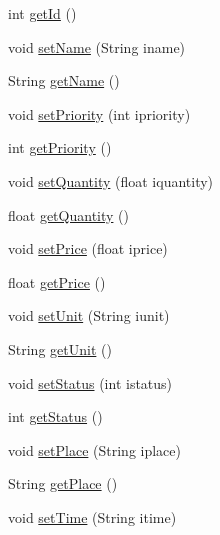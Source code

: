 \begin{DoxyCompactItemize}
\item 
int \hyperlink{classvip2012_1_1g07_1_1shoppinglist_1_1Item_ad9414ee145d458f315961c1f2e2faf60}{get\-Id} ()
\item 
void \hyperlink{classvip2012_1_1g07_1_1shoppinglist_1_1Item_aa9872e25ee885972342abda59bb3f616}{set\-Name} (String iname)
\item 
String \hyperlink{classvip2012_1_1g07_1_1shoppinglist_1_1Item_a88788d3b8f741aa86f961b71416a55be}{get\-Name} ()
\item 
void \hyperlink{classvip2012_1_1g07_1_1shoppinglist_1_1Item_a447e1639777c78e1a03e3e76553c94d5}{set\-Priority} (int ipriority)
\item 
int \hyperlink{classvip2012_1_1g07_1_1shoppinglist_1_1Item_a5b30fc72fb323a26f8982203546919f0}{get\-Priority} ()
\item 
void \hyperlink{classvip2012_1_1g07_1_1shoppinglist_1_1Item_aa3608aed9d930e5044b9f7cf6ac88830}{set\-Quantity} (float iquantity)
\item 
float \hyperlink{classvip2012_1_1g07_1_1shoppinglist_1_1Item_a18b61c503de2ea99dd5fb92cfcebfa65}{get\-Quantity} ()
\item 
void \hyperlink{classvip2012_1_1g07_1_1shoppinglist_1_1Item_af390549fc22ae4b5921db2b6756a80d6}{set\-Price} (float iprice)
\item 
float \hyperlink{classvip2012_1_1g07_1_1shoppinglist_1_1Item_a468a3c13f380186f4c1ece14fa1d81b4}{get\-Price} ()
\item 
void \hyperlink{classvip2012_1_1g07_1_1shoppinglist_1_1Item_a8faa4542fe3e3ea454b31834428e07a0}{set\-Unit} (String iunit)
\item 
String \hyperlink{classvip2012_1_1g07_1_1shoppinglist_1_1Item_a6d4d111b97ef0783982e0faed94ec4dd}{get\-Unit} ()
\item 
void \hyperlink{classvip2012_1_1g07_1_1shoppinglist_1_1Item_ac4fbd66028ac6e5b7add443b0312a05f}{set\-Status} (int istatus)
\item 
int \hyperlink{classvip2012_1_1g07_1_1shoppinglist_1_1Item_add03c73583d9e0199a6bc8d2c1ca1267}{get\-Status} ()
\item 
void \hyperlink{classvip2012_1_1g07_1_1shoppinglist_1_1Item_ae91940cd4dd19d11851f3d2be8d27447}{set\-Place} (String iplace)
\item 
String \hyperlink{classvip2012_1_1g07_1_1shoppinglist_1_1Item_a5c29e7a6abded44e109539782f479ff0}{get\-Place} ()
\item 
void \hyperlink{classvip2012_1_1g07_1_1shoppinglist_1_1Item_a30904a8747453fce947be54059dac795}{set\-Time} (String itime)

\end{DoxyCompactItemize}
